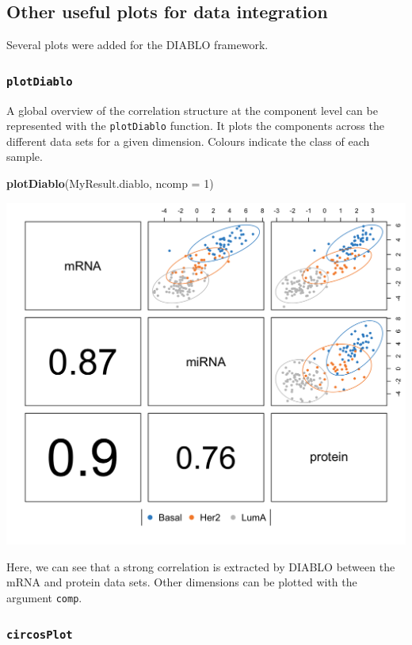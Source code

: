 \documentclass[]{book}
\newenvironment{Shaded}{\begin{snugshade}}{\end{snugshade}}
\newcommand{\KeywordTok}[1]{\textcolor[rgb]{0.13,0.29,0.53}{\textbf{#1}}}
\newcommand{\DataTypeTok}[1]{\textcolor[rgb]{0.13,0.29,0.53}{#1}}
\newcommand{\DecValTok}[1]{\textcolor[rgb]{0.00,0.00,0.81}{#1}}
\newcommand{\NormalTok}[1]{#1}
\theoremstyle{definition}
\theoremstyle{definition}
\theoremstyle{definition}
\theoremstyle{remark}
\begin{document}
\subsection{Other useful plots for data
integration}\label{other-useful-plots-for-data-integration-1}

Several plots were added for the DIABLO framework.

\subsubsection{\texorpdfstring{\texttt{plotDiablo}}{plotDiablo}}\label{plotdiablo}

A global overview of the correlation structure at the component level
can be represented with the \texttt{plotDiablo} function. It plots the
components across the different data sets for a given dimension. Colours
indicate the class of each sample.

\begin{Shaded}
\begin{Highlighting}[]
\KeywordTok{plotDiablo}\NormalTok{(MyResult.diablo, }\DataTypeTok{ncomp =} \DecValTok{1}\NormalTok{)}
\end{Highlighting}
\end{Shaded}

\begin{center}\includegraphics[width=0.5\linewidth]{Figures/unnamed-chunk-6-1} \end{center}

Here, we can see that a strong correlation is extracted by DIABLO
between the mRNA and protein data sets. Other dimensions can be plotted
with the argument \texttt{comp}.

\subsubsection{\texorpdfstring{\texttt{circosPlot}}{circosPlot}}\label{circosplot}
\end{document}
